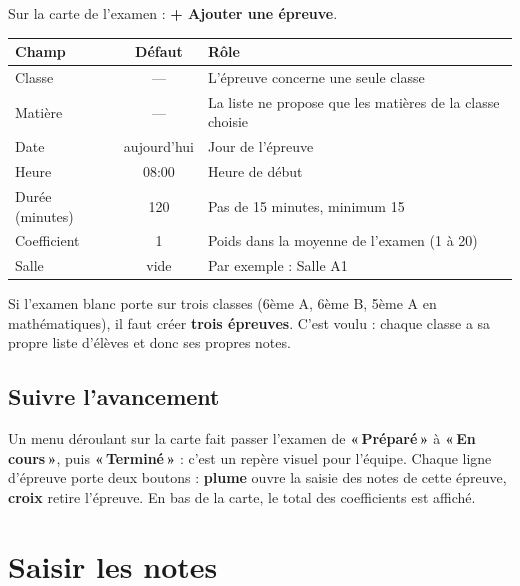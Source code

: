 \documentclass[11pt,a4paper]{article}
\newcommand{\menu}[1]{\textbf{«\,#1\,»}}
\newcommand{\bouton}[1]{\textbf{#1}}
\begin{document}
Sur la carte de l'examen : \bouton{+ Ajouter une épreuve}.

\begin{center}
\renewcommand{\arraystretch}{1.25}
\begin{tabularx}{\textwidth}{@{} >{\raggedright}p{3.6cm} c X@{}}
\toprule
\textbf{Champ} & \textbf{Défaut} & \textbf{Rôle} \\
\midrule
Classe & — & L'épreuve concerne une seule classe \\
Matière & — & La liste ne propose que les matières de la classe choisie \\
Date & aujourd'hui & Jour de l'épreuve \\
Heure & 08:00 & Heure de début \\
Durée (minutes) & 120 & Pas de 15 minutes, minimum 15 \\
Coefficient & 1 & Poids dans la moyenne de l'examen (1 à 20) \\
Salle & vide & Par exemple : Salle A1 \\
\bottomrule
\end{tabularx}
\end{center}

\begin{boiteastuce}
Si l'examen blanc porte sur trois classes (6ème A, 6ème B, 5ème A en
mathématiques), il faut créer \textbf{trois épreuves}. C'est voulu : chaque classe
a sa propre liste d'élèves et donc ses propres notes.
\end{boiteastuce}

\subsection{Suivre l'avancement}

Un menu déroulant sur la carte fait passer l'examen de \menu{Préparé} à
\menu{En cours}, puis \menu{Terminé} : c'est un repère visuel pour l'équipe.
Chaque ligne d'épreuve porte deux boutons : \bouton{plume} ouvre la saisie des
notes de cette épreuve, \bouton{croix} retire l'épreuve. En bas de la carte, le
total des coefficients est affiché.

\newpage

\section{Saisir les notes}
\end{document}
